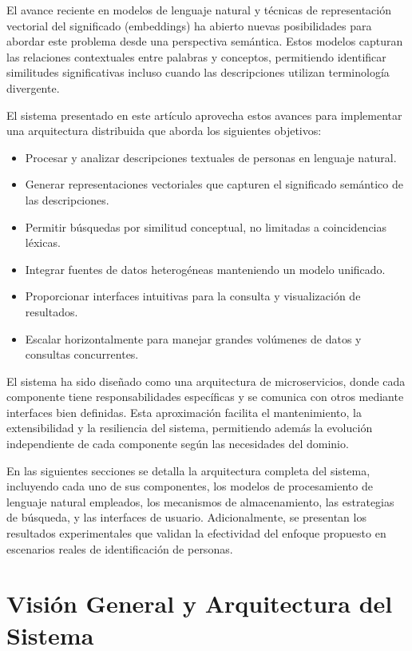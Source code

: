 \documentclass[12pt,a4paper]{article}
\begin{document}
El avance reciente en modelos de lenguaje natural y técnicas de representación vectorial del significado (embeddings) ha abierto nuevas posibilidades para abordar este problema desde una perspectiva semántica. Estos modelos capturan las relaciones contextuales entre palabras y conceptos, permitiendo identificar similitudes significativas incluso cuando las descripciones utilizan terminología divergente.

El sistema presentado en este artículo aprovecha estos avances para implementar una arquitectura distribuida que aborda los siguientes objetivos:

\begin{itemize}
    \item Procesar y analizar descripciones textuales de personas en lenguaje natural.
    \item Generar representaciones vectoriales que capturen el significado semántico de las descripciones.
    \item Permitir búsquedas por similitud conceptual, no limitadas a coincidencias léxicas.
    \item Integrar fuentes de datos heterogéneas manteniendo un modelo unificado.
    \item Proporcionar interfaces intuitivas para la consulta y visualización de resultados.
    \item Escalar horizontalmente para manejar grandes volúmenes de datos y consultas concurrentes.
\end{itemize}

El sistema ha sido diseñado como una arquitectura de microservicios, donde cada componente tiene responsabilidades específicas y se comunica con otros mediante interfaces bien definidas. Esta aproximación facilita el mantenimiento, la extensibilidad y la resiliencia del sistema, permitiendo además la evolución independiente de cada componente según las necesidades del dominio.

En las siguientes secciones se detalla la arquitectura completa del sistema, incluyendo cada uno de sus componentes, los modelos de procesamiento de lenguaje natural empleados, los mecanismos de almacenamiento, las estrategias de búsqueda, y las interfaces de usuario. Adicionalmente, se presentan los resultados experimentales que validan la efectividad del enfoque propuesto en escenarios reales de identificación de personas.

\section{Visión General y Arquitectura del Sistema}
\label{sec:arquitectura}
\end{document}
